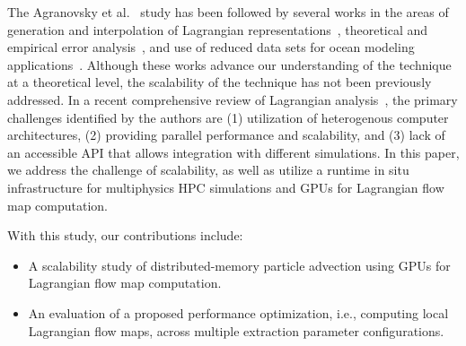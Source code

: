 The Agranovsky et al.~\cite{agranovsky2014improved} study has been followed by several works in the areas of generation and interpolation of Lagrangian representations~\cite{chandler2015interpolation, sane2019interpolation, rapp2019void, jakob2020fluid}, theoretical and empirical error analysis~\cite{bujack2015lagrangian, chandler2016analysis, hummel2016error, sane2018revisiting}, and use of reduced data sets for ocean modeling applications~\cite{envirvis.20171099}.
%
Although these works advance our understanding of the technique at a theoretical level, the scalability of the technique has not been previously addressed. 
%
%
In a recent comprehensive review of Lagrangian analysis~\cite{VANSEBILLE201849}, the primary challenges identified by the authors are (1) utilization of heterogenous computer architectures, (2) providing parallel performance and scalability, and (3) lack of an accessible API that allows integration with different simulations. 
%
In this paper, we address the challenge of scalability, as well as utilize a runtime in situ infrastructure for multiphysics HPC simulations and GPUs for Lagrangian flow map computation. 

With this study, our contributions include:
\begin{itemize}[leftmargin=*]
\item A scalability study of distributed-memory particle advection using GPUs for Lagrangian flow map computation. 
\item An evaluation of a proposed performance optimization, i.e., computing local Lagrangian flow maps, across multiple extraction parameter configurations.
\end{itemize}

%
%

